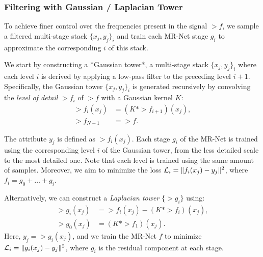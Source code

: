 \subsubsection{Filtering with Gaussian / Laplacian Tower}

To achieve finer control over the frequencies present in the signal $\gt{f}$, we sample a filtered multi-stage stack $\{x_j, y_j\}_i$ and train each MR-Net stage $g_i$ to approximate the corresponding $i$ of this stack.

We start by constructing a *Gaussian tower*, a multi-stage stack $\{x_j, y_j\}_i$ where each level $i$ is derived by applying a low-pass filter to the preceding level $i+1$. Specifically, the Gaussian tower $\{x_j, y_j\}_i$ is generated recursively by convolving the \textit{level of detail} $\gt{f}_i$ of $\gt{f}$ with a Gaussian kernel $K$:
\begin{align*}
    \gt{f}_i(x_j) &= \left(K * \gt{f}_{i+1}\right)(x_j), \\
    \gt{f}_{N-1} &= \gt{f}.
\end{align*}

The attribute $y_j$ is defined as $\gt{f}_i(x_j)$. 
Each stage $g_i$ of the MR-Net is trained using the corresponding level $i$ of the Gaussian tower, from the less detailed scale to the most detailed one. Note that each level is trained using the same amount of samples. Moreover, we aim to minimize the loss $\mathcal{L}_i = \lVert f_i(x_j)-y_j\rVert^2$, where $f_i = g_0 + \dots + g_{i}$.


Alternatively, we can construct a \textit{Laplacian tower} $\{\gt{g}_i\}$ using:
\begin{align*}
    \gt{g}_i(x_j) &= \gt{f}_i(x_j) - \left(K * \gt{f}_i\right)(x_j), \\
    \gt{g}_0(x_j) &= \left(K * \gt{f}_1\right)(x_j).
\end{align*}
Here, $y_j = \gt{g}_i(x_j)$, and we train the MR-Net $f$ to minimize $\mathcal{L}_i = \lVert g_i(x_j)-y_j\rVert^2$, where $g_i$ is the residual component at each stage.


